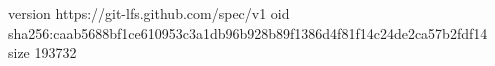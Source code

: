 version https://git-lfs.github.com/spec/v1
oid sha256:caab5688bf1ce610953c3a1db96b928b89f1386d4f81f14c24de2ca57b2fdf14
size 193732
